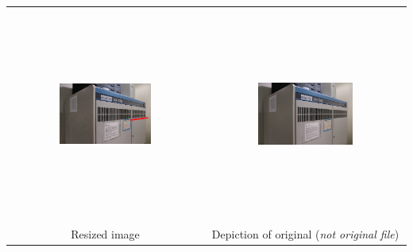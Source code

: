 \documentclass[11pt]{article}
\begin{document}
\begin{tabular}{c c}
\includegraphics[width=0.49\textwidth,height=7cm,keepaspectratio]{images/poor_nancy_markup.png} &
\includegraphics[width=0.49\textwidth,height=7cm,keepaspectratio]{images/poor_nancy_better.png} \\
Resized image & Depiction of original (\emph{not original file})
\end{tabular}

\end{document}
